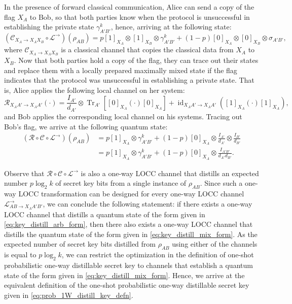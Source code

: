 \documentclass[twocolumn,letterpaper, dvipsnames,allowtoday, accepted = 2025-12-31]{quantumarticle}
\begin{document}
In the presence of forward classical communication, Alice can send a copy of the flag $X_A$ to Bob, so that both parties know when the protocol is unsuccessful in establishing the private state $\gamma^k_{A'B'}$, hence, arriving at the following state:
\begin{equation}
    (\mathcal{C}_{X_A\to X_AX_B}\circ\mathcal{L}^{\to})\left(\rho_{AB}\right) = p[1]_{X_A}\otimes[1]_{X_B}\otimes\gamma^k_{A'B'}
    + (1-p)[0]_{X_A}\otimes[0]_{X_B}\otimes\sigma_{A'B'},
\end{equation}
where $\mathcal{C}_{X_A\to X_AX_B}$ is a classical channel that copies the classical data from $X_A$ to $X_B$. Now that both parties hold a copy of the flag, they can trace out their states and replace them with a locally prepared maximally mixed state if the flag indicates that the protocol was unsuccessful in establishing a private state. That is, Alice applies the following local channel on her system:
\begin{equation}
    \mathcal{R}_{X_AA'\to X_AA'}\!\left(\cdot\right) = \frac{I_{A'}}{d_{A'}}\otimes\operatorname{Tr}_{A'}\!\left[[0]_{X_A}\left(\cdot\right)[0]_{X_A}\right] + \operatorname{id}_{X_AA'\to X_AA'}\!\left([1]_{X_A}\left(\cdot\right)[1]_{X_A}\right),
\end{equation}
and Bob applies the corresponding local channel on his systems. Tracing out Bob's flag, we arrive at the following quantum state:
\begin{align}
    (\mathcal{R}\circ\mathcal{C}\circ\mathcal{L}^{\to})\!\left(\rho_{AB}\right)
    &= p[1]_{X_A}\otimes\gamma^k_{A'B'} + (1-p)[0]_{X_A}\otimes\frac{I_{A'}}{d_{A'}}\otimes\frac{I_{B'}}{d_{B'}}\\
    &= p[1]_{X_A}\otimes\gamma^k_{A'B'} + (1-p)[0]_{X_A}\otimes\frac{I_{A'B'}}{d_{A'}d_{B'}}.\label{eq:key_distill_mix_form}
\end{align}

Observe that $\mathcal{R}\circ\mathcal{C}\circ\mathcal{L}^{\to}$ is also a one-way LOCC channel that distills an expected number $p\log_2 k$ of  secret key bits from a single instance of $\rho_{AB}$. Since such a one-way LOCC transformation can be designed for every one-way LOCC channel $\mathcal{L}^{\to}_{AB\to X_AA'B'}$, we can conclude the following statement: if there exists a one-way LOCC channel that distills a quantum state of the form given in \eqref{eq:key_distill_arb_form}, then there also exists a one-way LOCC channel that distills the quantum state of the form given in \eqref{eq:key_distill_mix_form}. As the expected number of secret key bits distilled from $\rho_{AB}$ using either of the channels is equal to $p\log_2 k$, we can restrict the optimization in the definition of one-shot probabilistic one-way distillable secret key to channels that establish a quantum state of the form given in \eqref{eq:key_distill_mix_form}. Hence, we arrive at the equivalent definition of the one-shot probabilistic one-way distillable secret key given in \eqref{eq:prob_1W_distill_key_defn}.
\end{document}
